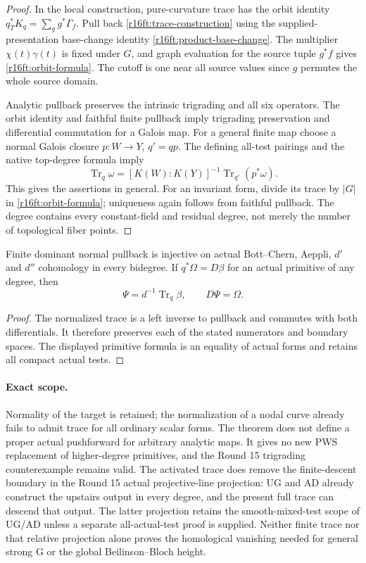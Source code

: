 \begin{proof}
In the local construction, pure-curvature trace has the orbit identity
$q_T^*K_q=\sum_g g^*\Gamma_f$. Pull back
\eqref{r16ft:trace-construction} using the supplied-presentation
base-change identity \eqref{r16ft:product-base-change}. The multiplier
$\chi(t)\gamma(t)$ is fixed under $G$, and graph evaluation for the
source tuple $g^*f$ gives \eqref{r16ft:orbit-formula}. The cutoff is
one near all source values since $g$ permutes the whole source domain.

Analytic pullback preserves the intrinsic trigrading and all six
operators. The orbit identity and faithful finite pullback imply
trigrading preservation and differential commutation for a Galois map.
For a general finite map choose a normal Galois closure $p:W\to Y$,
$q'=qp$. The defining all-test pairings and the native top-degree
formula imply
\[
 \operatorname{Tr}_q\omega
      =[K(W):K(Y)]^{-1}\operatorname{Tr}_{q'}(p^*\omega).
\]
This gives the assertions in general. For an invariant form, divide its
trace by $|G|$ in \eqref{r16ft:orbit-formula}; uniqueness again follows
from faithful pullback. The degree contains every constant-field and
residual degree, not merely the number of topological fiber points.
\end{proof}

\begin{corollary}
\label{r16ft:cohomology}
Finite dominant normal pullback is injective on actual Bott--Chern,
Aeppli, $d'$ and $d''$ cohomology in every bidegree. If
$q^*\Omega=D\beta$ for an actual primitive of any degree, then
\[
          \Psi=d^{-1}\operatorname{Tr}_q\beta,
                     \qquad D\Psi=\Omega.
 \tag{FT16.15}\label{r16ft:primitive}
\]
\end{corollary}

\begin{proof}
The normalized trace is a left inverse to pullback and commutes with
both differentials. It therefore preserves each of the stated
numerators and boundary spaces. The displayed primitive formula is
an equality of actual forms and retains all compact actual tests.
\end{proof}

\paragraph{Exact scope.}
Normality of the target is retained; the normalization of a nodal curve
already fails to admit trace for all ordinary scalar forms. The theorem
does not define a proper actual pushforward for arbitrary analytic maps.
It gives no new PWS replacement of higher-degree primitives, and the
Round 15 trigrading counterexample remains valid. The activated trace does
remove the finite-descent boundary in the Round 15 actual projective-line
projection: UG and AD already construct the upstairs output in every
degree, and the present full trace can descend that output. The latter
projection retains the smooth-mixed-test scope of UG/AD unless a separate
all-actual-test proof is supplied. Neither finite trace nor that relative
projection alone proves the homological vanishing needed for general
strong G or the global Beilinson--Bloch height.
